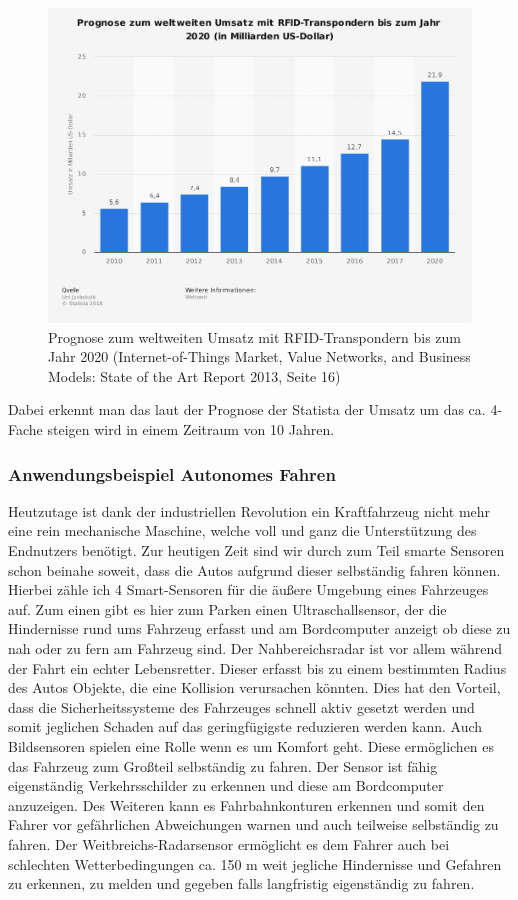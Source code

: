\documentclass[a4paper,12pt]{scrartcl}
\begin{document}
\begin{figure}[H]
\centering
\includegraphics[scale=0.45]{picture/prognoserfid}
\caption{Prognose zum weltweiten Umsatz mit RFID-Transpondern bis zum Jahr 2020 (Internet-of-Things Market, Value Networks, and Business Models: State of the Art Report 2013, Seite 16)}
\label{fig:Prognose Umsatz RFID Sensors}
\end{figure}

Dabei erkennt man das laut der Prognose der Statista der Umsatz um das ca. 4-Fache steigen wird in einem Zeitraum von 10 Jahren.


\subsubsection{Anwendungsbeispiel Autonomes Fahren}
Heutzutage ist dank der industriellen Revolution ein Kraftfahrzeug nicht mehr eine rein mechanische Maschine, welche voll und ganz die Unterstützung des Endnutzers benötigt. Zur heutigen Zeit sind wir durch zum Teil smarte Sensoren schon beinahe soweit, dass die Autos aufgrund dieser selbständig fahren können.
Hierbei zähle ich 4 Smart-Sensoren für die äußere Umgebung eines Fahrzeuges auf.
Zum einen gibt es hier zum Parken einen Ultraschallsensor, der die Hindernisse rund ums Fahrzeug erfasst und am Bordcomputer anzeigt ob diese zu nah oder zu fern am Fahrzeug sind.
Der Nahbereichsradar ist vor allem während der Fahrt ein echter Lebensretter. Dieser erfasst bis zu einem bestimmten Radius des Autos Objekte, die eine Kollision verursachen könnten. Dies hat den Vorteil, dass die Sicherheitssysteme des Fahrzeuges schnell aktiv gesetzt werden und somit jeglichen Schaden auf das geringfügigste reduzieren werden kann.
Auch Bildsensoren spielen eine Rolle wenn es um Komfort geht. Diese ermöglichen es das Fahrzeug zum Großteil selbständig zu fahren. Der Sensor ist fähig eigenständig Verkehrsschilder zu erkennen und diese am Bordcomputer anzuzeigen. Des Weiteren kann es Fahrbahnkonturen erkennen und somit den Fahrer vor gefährlichen Abweichungen warnen und auch teilweise selbständig zu fahren.
Der Weitbreichs-Radarsensor ermöglicht es dem Fahrer auch bei schlechten Wetterbedingungen ca. 150 m weit jegliche Hindernisse und Gefahren zu erkennen, zu melden und gegeben falls langfristig eigenständig zu fahren.\cite{Sensoren im Kraftfahrzeug, Seite 15}\\
\end{document}
